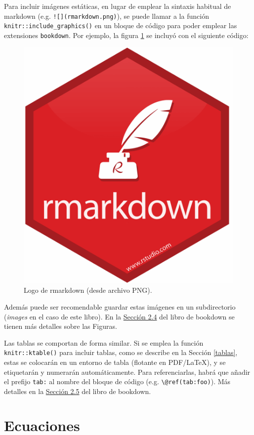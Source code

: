 \documentclass[]{book}
\newenvironment{Shaded}{\begin{snugshade}}{\end{snugshade}}
\newcommand{\NormalTok}[1]{#1}
\theoremstyle{definition}
\theoremstyle{definition}
\theoremstyle{definition}
\theoremstyle{remark}
\begin{document}
Para incluir imágenes estáticas, en lugar de emplear la sintaxis
habitual de markdown (e.g. \texttt{!{[}{]}(rmarkdown.png)}), se puede
llamar a la función \texttt{knitr::include\_graphics()} en un bloque de
código para poder emplear las extensiones \texttt{bookdown}. Por
ejemplo, la figura \ref{fig:rmarkdown} se incluyó con el siguiente
código:

\begin{Shaded}
\end{Shaded}

\begin{figure}

{\centering \includegraphics[width=0.3\linewidth]{images/rmarkdown} 

}

\caption{Logo de rmarkdown (desde archivo PNG).}\label{fig:rmarkdown}
\end{figure}

Además puede ser recomendable guardar estas imágenes en un subdirectorio
(\emph{images} en el caso de este libro). En la
\href{https://bookdown.org/yihui/bookdown/figures.html}{Sección 2.4} del
libro de bookdown se tienen más detalles sobre las Figuras.

Las tablas se comportan de forma similar. Si se emplea la función
\texttt{knitr::ktable()} para incluir tablas, como se describe en la
Sección \ref{tablas}, estas se colocarán en un entorno de tabla
(flotante en PDF/LaTeX), y se etiquetarán y numerarán automáticamente.
Para referenciarlas, habrá que añadir el prefijo \texttt{tab:} al nombre
del bloque de código (e.g. \texttt{\textbackslash{}@ref(tab:foo)}). Más
detalles en la
\href{https://bookdown.org/yihui/bookdown/tables.html}{Sección 2.5} del
libro de bookdown.

\section{Ecuaciones}\label{ecuaciones}
\end{document}
